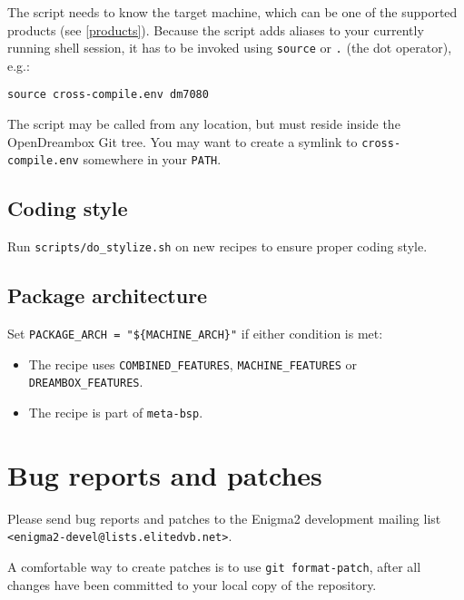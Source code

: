 \documentclass[a4paper]{article}
\newcommand{\shell}[1]{\texttt{\small #1}}
\begin{document}
    The script needs to know the target machine, which can be one of the supported products (see \ref{products}). Because the script
    adds aliases to your currently running shell session, it has to be invoked using \shell{source} or \shell{.} (the dot operator), e.g.:

    \shell{source cross-compile.env dm7080}

    The script may be called from any location, but must reside inside the OpenDreambox Git tree.
    You may want to create a symlink to \shell{cross-compile.env} somewhere in your \shell{PATH}.

  \subsection{Coding style}
    Run \shell{scripts/do\_stylize.sh} on new recipes to ensure proper coding style.

  \subsection {Package architecture}
    Set \shell{PACKAGE\_ARCH = "\$\{MACHINE\_ARCH\}"} if either condition is met:
    \begin{itemize}
      \item The recipe uses \shell{COMBINED\_FEATURES}, \shell{MACHINE\_FEATURES} or \shell{DREAMBOX\_FEATURES}.
      \item The recipe is part of \shell{meta-bsp}.
    \end{itemize}

\section{Bug reports and patches}

  Please send bug reports and patches to the Enigma2 development mailing list \shell{<enigma2-devel@lists.elitedvb.net>}.

  A comfortable way to create patches is to use \shell{git format-patch}, after all changes have been committed to your
  local copy of the repository.
\end{document}
